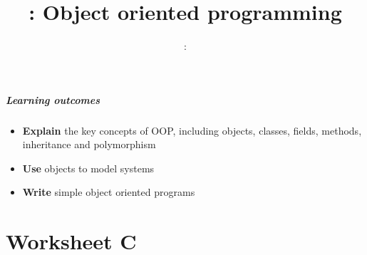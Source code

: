 \usepackage{../../beamerthemeFalmouthGamesAcademy}
\usepackage{multimedia}
\graphicspath{ {../../} }

\usepackage[utf8]{inputenc}

\lstset{language=Python
}

\usepackage[normalem]{ulem}
\usepackage{wasysym}

\usepackage{pdfpages}

\usetikzlibrary{arrows,automata}




\title{\sessionnumber: Object oriented programming}
\subtitle{\modulecode: \moduletitle}

\frame{\titlepage} 

\begin{frame}
	\frametitle{Learning outcomes}
	\begin{itemize}
    \item\textbf{Explain} the key concepts of OOP, including objects, classes, fields, methods, inheritance and polymorphism
    \item\textbf{Use} objects to model systems
    \item\textbf{Write} simple object oriented programs
	\end{itemize}
\end{frame}




\part{Worksheet C}
\frame{\partpage}


